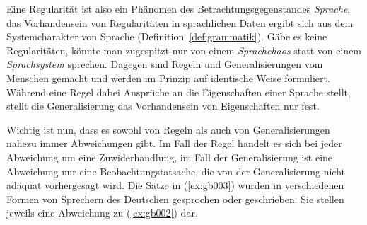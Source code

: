 

Eine Regularität ist also ein Phänomen des Betrachtungsgegenstandes \textit{Sprache}, das Vorhandensein von Regularitäten in sprachlichen Daten ergibt sich aus dem Systemcharakter von Sprache (Definition~\ref{def:grammatik}).
Gäbe es keine Regularitäten, könnte man zugespitzt nur von einem \textit{Sprachchaos} statt von einem \textit{Sprachsystem} sprechen.
Dagegen sind Regeln und Generalisierungen vom Menschen gemacht und werden im Prinzip auf identische Weise formuliert.
Während eine Regel dabei Ansprüche an die Eigenschaften einer Sprache stellt, stellt die Generalisierung das Vorhandensein von Eigenschaften nur fest.

Wichtig ist nun, dass es sowohl von Regeln als auch von Generalisierungen nahezu immer Abweichungen gibt.
Im Fall der Regel handelt es sich bei jeder Abweichung um eine Zuwiderhandlung, im Fall der Generalisierung ist eine Abweichung nur eine Beobachtungstatsache, die von der Generalisierung nicht adäquat vorhergesagt wird.
Die Sätze in (\ref{ex:gb003}) wurden in verschiedenen Formen von Sprechern des Deutschen gesprochen oder geschrieben.
Sie stellen jeweils eine Abweichung zu (\ref{ex:gb002}) dar.

\begin{exe}
  \ex\label{ex:gb003}
  \begin{xlist}
  \end{xlist}
\end{exe}


